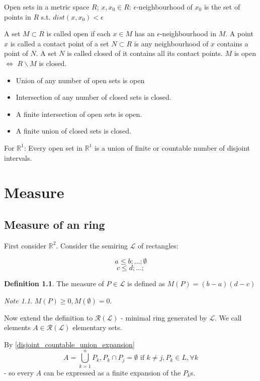 \documentclass[11pt,a4paper]{report}
\theoremstyle{plain}
\theoremstyle{definition}
\newtheorem*{defn}{Definition}
\theoremstyle{remark}
\newtheorem*{note}{Note}
\newcommand{\R}{\mathbb{R}}
\newcommand{\cL}{\mathcal{L}}
\newcommand{\cR}{\mathcal{R}}
\begin{document}
Open sets in a metric space $R$; $x, x_0 \in R$:
$\epsilon$-neighbourhood of $x_0$ is the set of points in $R$ s.t. $dist(x, x_0) < \epsilon$

A set $M \subset R$ is called open if each $x \in M$ has an $\epsilon$-neighbourhood in $M$.
A point $x$ is called a contact point of a set $N\subset R$ is any neighbourhood of $x$ contains a point of $N$.
A set $N$ is called closed of it contains all its contact points.
$M$ is open $\Leftrightarrow $ $R \backslash M$ is closed.

\begin{itemize}
  \item Union of any number of open sets is open
  \item Intersection of any number of closed sets is closed.
  \item A finite intersection of open sets is open.
  \item A finite union of closed sets is closed.
\end{itemize}

For $\R^1$: Every open set in $\R^1$ is a union of finite or countable number of disjoint intervals.


\chapter{Measure}

\section{Measure of an ring}

First consider $\R^2$. Consider the semiring $\cL$ of rectangles:

\[ a \leq b; \dots; \emptyset \]
\[ c \leq d; \dots; \]

\begin{defn}
  The measure of $P \in \cL$ is defined as $M(P)=(b-a)(d-c)$
\end{defn}

\begin{note}
    $M(P) \geq 0, M(\emptyset) = 0$.
\end{note}

Now extend the definition to $\cR(\cL)$ - minimal ring generated by $\cL$.
We call elements $A \in \cR(\cL)$ elementary sets.

By \ref{disjoint_countable_union_expansion}
\[ A = \bigcup_{k=1}^n P_k, P_k \cap P_j = \emptyset \text{ if } k \neq j, P_k \in L, \forall k \]
- so every $A$ can be expressed as a finite expansion of the $P_k$s.
\end{document}
